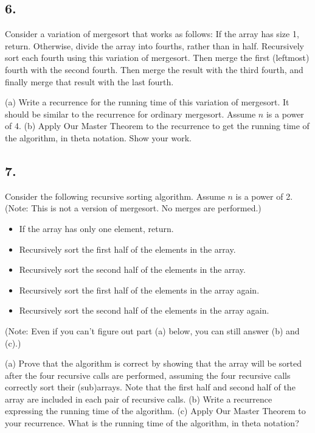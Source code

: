\documentclass{article}
\begin{document}

\subsection*{6.}
Consider a variation of mergesort that works as follows: If the array has size 1, return. Otherwise, divide the array into fourths, rather than in half. Recursively sort each fourth using this variation of mergesort. Then merge the first (leftmost) fourth with the second fourth. Then merge the result with the third fourth, and finally merge that result with the last fourth.

(a) Write a recurrence for the running time of this variation of mergesort. It should be similar to the recurrence for ordinary mergesort. Assume $n$ is a power of 4.
(b) Apply Our Master Theorem to the recurrence to get the running time of the algorithm, in theta notation. Show your work.


\subsection*{7.}
Consider the following recursive sorting algorithm. Assume $n$ is a power of 2. (Note: This is not a version of mergesort. No merges are performed.)

\begin{itemize}
    \item If the array has only one element, return.
    \item Recursively sort the first half of the elements in the array.
    \item Recursively sort the second half of the elements in the array.
    \item Recursively sort the first half of the elements in the array again.
    \item Recursively sort the second half of the elements in the array again.
\end{itemize}
(Note: Even if you can’t figure out part (a) below, you can still answer (b) and (c).)

(a) Prove that the algorithm is correct by showing that the array will be sorted after the four recursive calls are performed, assuming the four recursive calls correctly sort their (sub)arrays. Note that the first half and second half of the array are included in each pair of recursive calls.
(b) Write a recurrence expressing the running time of the algorithm.
(c) Apply Our Master Theorem to your recurrence. What is the running time of the algorithm, in theta notation?
\end{document}
